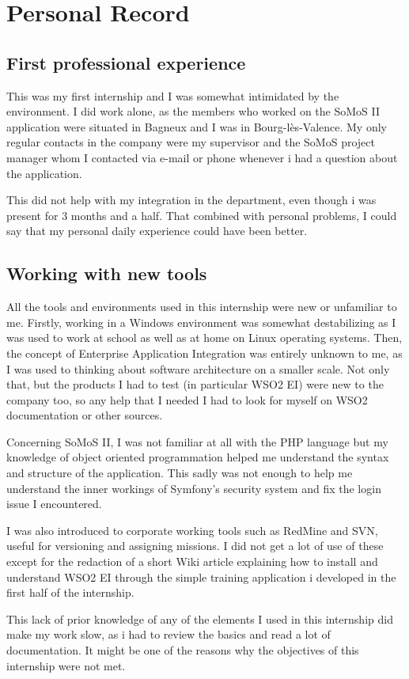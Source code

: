 \documentclass[12pt,a4paper,twoside]{article}
\begin{document}
\section{Personal Record}
\subsection{First professional experience}
This was my first internship and I was somewhat intimidated by the environment. I did work alone, as the members who worked on the SoMoS II application were situated in Bagneux and I was in Bourg-lès-Valence. My only regular contacts in the company were my supervisor and the SoMoS project manager whom I contacted via e-mail or phone whenever i had a question about the application.

This did not help with my integration in the department, even though i was present for 3 months and a half. That combined with personal problems, I could say that my personal daily experience could have been better.  
\subsection{Working with new tools}
All the tools and environments used in this internship were new or unfamiliar to me. Firstly, working in a Windows environment was somewhat destabilizing as I was used to work at school as well as at home on Linux operating systems. Then, the concept of Enterprise Application Integration was entirely unknown to me, as I was used to thinking about software architecture on a smaller scale. Not only that, but the products I had to test (in particular WSO2 EI) were new to the company too, so any help that I needed I had to look for myself on WSO2 documentation or other sources.

Concerning SoMoS II, I was not familiar at all with the PHP language but my knowledge of object oriented programmation helped me understand the syntax and structure of the application. This sadly was not enough to help me understand the inner workings 
of Symfony's security system and fix the login issue I encountered.

I was also introduced to corporate working tools such as RedMine and SVN, useful for versioning and assigning missions. I did not get a lot of use of these except for the redaction of a short Wiki article explaining how to install and understand WSO2 EI through the simple training application i developed in the first half of the internship.

This lack of prior knowledge of any of the elements I used in this internship did make my work slow, as i had to review the basics and read a lot of documentation. It might be one of the reasons why the objectives of this internship were not met.
\end{document}
